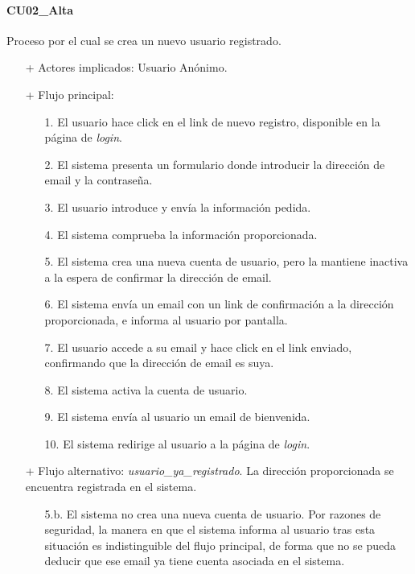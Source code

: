 \documentclass[a4paper]{article}
\begin{document}
            \paragraph{CU02\_Alta}
            Proceso por el cual se crea un nuevo usuario registrado.
            \begin{itemize}
                \item[+] Actores implicados: Usuario Anónimo.
                \item[+] Flujo principal:
                \begin{enumerate}
                    \item[1.] El usuario hace click en el link de nuevo registro, disponible en la página de \emph{login}.
                    \item[2.] El sistema presenta un formulario donde introducir la dirección de email y la contraseña.
                    \item[3.] El usuario introduce y envía la información pedida.
                    \item[4.] El sistema comprueba la información proporcionada.
                    \item[5.] El sistema crea una nueva cuenta de usuario, pero la mantiene inactiva a la espera de confirmar la dirección de email.
                    \item[6.] El sistema envía un email con un link de confirmación a la dirección proporcionada, e informa al usuario por pantalla.
                    \item[7.] El usuario accede a su email y hace click en el link enviado, confirmando que la dirección de email es suya.
                    \item[8.] El sistema activa la cuenta de usuario.
                    \item[9.] El sistema envía al usuario un email de bienvenida.
                    \item[10.] El sistema redirige al usuario a la página de \emph{login}.
                \end{enumerate}
                \item[+] Flujo alternativo: \emph{usuario\_ya\_registrado}. La dirección proporcionada se encuentra registrada en el sistema.
                \begin{itemize}
                    \item[5.b.] El sistema no crea una nueva cuenta de usuario. Por razones de seguridad, la manera en que el sistema informa al usuario tras esta situación es indistinguible del flujo principal, de forma que no se pueda deducir que ese email ya tiene cuenta asociada en el sistema.

\end{itemize}
\end{itemize}
\end{document}
